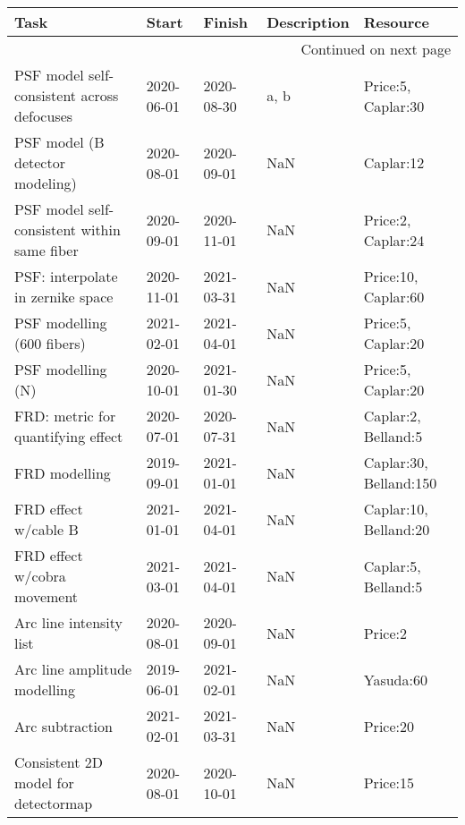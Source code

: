 \begin{longtable}{lllp{2cm}l}
\toprule
                                        Task &       Start &      Finish & Description &                Resource \\
\midrule
\endhead
\midrule
\multicolumn{5}{r}{{Continued on next page}} \\
\midrule
\endfoot

\bottomrule
\endlastfoot
  PSF model self-consistent across defocuses &  2020-06-01 &  2020-08-30 &        a, b &      Price:5, Caplar:30 \\
             PSF model (B detector modeling) &  2020-08-01 &  2020-09-01 &         NaN &               Caplar:12 \\
 PSF model self-consistent within same fiber &  2020-09-01 &  2020-11-01 &         NaN &      Price:2, Caplar:24 \\
           PSF: interpolate in zernike space &  2020-11-01 &  2021-03-31 &         NaN &     Price:10, Caplar:60 \\
                  PSF modelling (600 fibers) &  2021-02-01 &  2021-04-01 &         NaN &      Price:5, Caplar:20 \\
                           PSF modelling (N) &  2020-10-01 &  2021-01-30 &         NaN &      Price:5, Caplar:20 \\
          FRD: metric for quantifying effect &  2020-07-01 &  2020-07-31 &         NaN &     Caplar:2, Belland:5 \\
                               FRD modelling &  2019-09-01 &  2021-01-01 &         NaN &  Caplar:30, Belland:150 \\
                        FRD effect w/cable B &  2021-01-01 &  2021-04-01 &         NaN &   Caplar:10, Belland:20 \\
                 FRD effect w/cobra movement &  2021-03-01 &  2021-04-01 &         NaN &     Caplar:5, Belland:5 \\
                     Arc line intensity list &  2020-08-01 &  2020-09-01 &         NaN &                 Price:2 \\
                Arc line amplitude modelling &  2019-06-01 &  2021-02-01 &         NaN &               Yasuda:60 \\
                             Arc subtraction &  2021-02-01 &  2021-03-31 &         NaN &                Price:20 \\
         Consistent 2D model for detectormap &  2020-08-01 &  2020-10-01 &         NaN &                Price:15 \\

\end{longtable}
